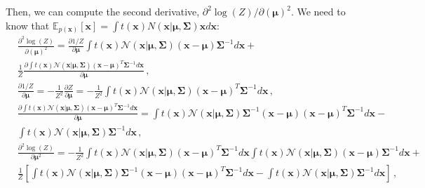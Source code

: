 Then, we can compute the second derivative, $\partial^2 \log (Z)/\partial (\boldsymbol{\mu})^2$. We need to know that $\mathds{E}_{p(\mathbf{x})}[\mathbf{x}] = \int t(\mathbf{x}) N(\mathbf{x}|\boldsymbol{\mu},\boldsymbol{\Sigma}) \mathbf{x} d \mathbf{x}$:
\begin{align}
& \frac{\partial^2 \log (Z)}{\partial (\boldsymbol{\mu})^2} = \frac{\partial 1/Z}{\partial \boldsymbol{\mu}} \int t(\mathbf{x}) \mathcal{N}(\mathbf{x}|\boldsymbol{\mu},\boldsymbol{\Sigma})(\mathbf{x} - \boldsymbol{\mu}) \boldsymbol{\Sigma}^{-1} d \mathbf{x} + \nonumber \\ & \frac{1}{Z} \frac{\partial \int t(\mathbf{x}) \mathcal{N}(\mathbf{x}|\boldsymbol{\mu},\boldsymbol{\Sigma}) (\mathbf{x} - \boldsymbol{\mu})^T \boldsymbol{\Sigma}^{-1} d \mathbf{x}}{\partial{\boldsymbol{\mu}}} \nonumber \,, \\
& \frac{\partial 1/Z}{\partial \boldsymbol{\mu}} = - \frac{1}{Z^2} \frac{\partial Z}{\partial \boldsymbol{\mu}}  = - \frac{1}{Z^2}  \int t(\mathbf{x}) \mathcal{N}(\mathbf{x}|\boldsymbol{\mu},\boldsymbol{\Sigma})  (\mathbf{x} - \boldsymbol{\mu})^T  \boldsymbol{\Sigma}^{-1}  d \mathbf{x} \nonumber \,, \\
& \frac{\partial \int t(\mathbf{x}) \mathcal{N}(\mathbf{x}|\boldsymbol{\mu},\boldsymbol{\Sigma})  (\mathbf{x} - \boldsymbol{\mu})^T  \boldsymbol{\Sigma}^{-1}  d\mathbf{x}}{ \partial \boldsymbol{\mu}} = \int t(\mathbf{x}) \mathcal{N}(\mathbf{x}|\boldsymbol{\mu},\boldsymbol{\Sigma})  \boldsymbol{\Sigma}^{-1} (\mathbf{x} - \boldsymbol{\mu}) (\mathbf{x} - \boldsymbol{\mu})^T  \boldsymbol{\Sigma}^{-1}  d\mathbf{x} - \nonumber \\ 
& \int t(\mathbf{x}) \mathcal{N}(\mathbf{x}|\boldsymbol{\mu},\boldsymbol{\Sigma})  \boldsymbol{\Sigma}^{-1} d\mathbf{x} \nonumber \,, \\
& \frac{\partial^2 \log (Z)}{\partial \boldsymbol{\mu}^2} = - \frac{1}{Z^2}  \int t(\mathbf{x}) \mathcal{N}(\mathbf{x}|\boldsymbol{\mu},\boldsymbol{\Sigma})  (\mathbf{x} - \boldsymbol{\mu})^T  \boldsymbol{\Sigma}^{-1}  d\mathbf{x}  \int t(\mathbf{x}) \mathcal{N}(\mathbf{x}|\boldsymbol{\mu},\boldsymbol{\Sigma})  (\mathbf{x} - \boldsymbol{\mu})  \boldsymbol{\Sigma}^{-1}  d\mathbf{x} + \nonumber \\ 
& \frac{1}{Z}  [ \int t(\mathbf{x}) \mathcal{N}(\mathbf{x}|\boldsymbol{\mu},\boldsymbol{\Sigma})  \boldsymbol{\Sigma}^{-1} (\mathbf{x} - \boldsymbol{\mu}) (\mathbf{x} - \boldsymbol{\mu})^T  \boldsymbol{\Sigma}^{-1}  d\mathbf{x} - \int t(\mathbf{x}) \mathcal{N}(\mathbf{x}|\boldsymbol{\mu},\boldsymbol{\Sigma})  \boldsymbol{\Sigma}^{-1} d\mathbf{x} ] \nonumber \,, \\

\end{align}
